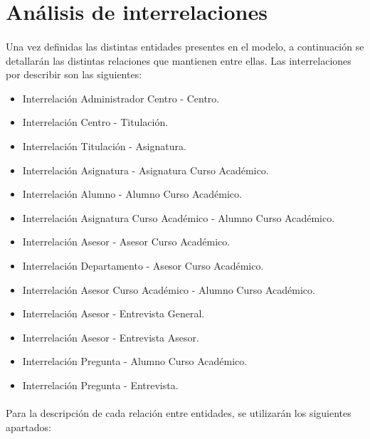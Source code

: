 \section{Análisis de interrelaciones}

   \paragraph{}Una vez definidas las distintas entidades presentes en el
   modelo, a continuación se detallarán las distintas relaciones que mantienen
   entre ellas. Las interrelaciones por describir son las siguientes:

   \begin{itemize}
    \item Interrelación Administrador Centro - Centro.
    \item Interrelación Centro - Titulación.
    \item Interrelación Titulación - Asignatura.
    \item Interrelación Asignatura - Asignatura Curso Académico.
    \item Interrelación Alumno - Alumno Curso Académico.
    \item Interrelación Asignatura Curso Académico - Alumno Curso Académico.
    \item Interrelación Asesor - Asesor Curso Académico.
    \item Interrelación Departamento - Asesor Curso Académico.
    \item Interrelación Asesor Curso Académico - Alumno Curso Académico.
    \item Interrelación Asesor - Entrevista General.
    \item Interrelación Asesor - Entrevista Asesor.
    \item Interrelación Pregunta - Alumno Curso Académico.
    \item Interrelación Pregunta - Entrevista.
   \end{itemize}

   \paragraph{}Para la descripción de cada relación entre entidades, se
   utilizarán los siguientes apartados:

